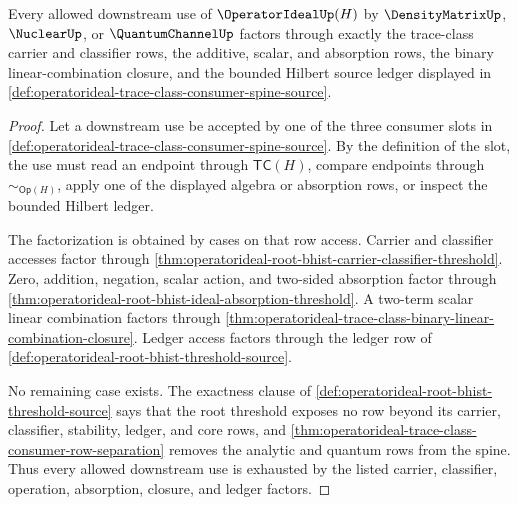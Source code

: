 \begin{theorem}
\label{thm:operatorideal-trace-class-consumer-exhaustion}
Every allowed downstream use of $\OperatorIdealUp(H)$ by $\DensityMatrixUp$, $\NuclearUp$, or $\QuantumChannelUp$ factors through exactly the trace-class carrier and classifier rows, the additive, scalar, and absorption rows, the binary linear-combination closure, and the bounded Hilbert source ledger displayed in \autoref{def:operatorideal-trace-class-consumer-spine-source}.
\end{theorem}
\begin{proof}
Let a downstream use be accepted by one of the three consumer slots in \autoref{def:operatorideal-trace-class-consumer-spine-source}. By the definition of the slot, the use must read an endpoint through $\mathsf{TC}(H)$, compare endpoints through $\sim_{\mathsf{Op}(H)}$, apply one of the displayed algebra or absorption rows, or inspect the bounded Hilbert ledger.

The factorization is obtained by cases on that row access. Carrier and classifier accesses factor through \autoref{thm:operatorideal-root-bhist-carrier-classifier-threshold}. Zero, addition, negation, scalar action, and two-sided absorption factor through \autoref{thm:operatorideal-root-bhist-ideal-absorption-threshold}. A two-term scalar linear combination factors through \autoref{thm:operatorideal-trace-class-binary-linear-combination-closure}. Ledger access factors through the ledger row of \autoref{def:operatorideal-root-bhist-threshold-source}.

No remaining case exists. The exactness clause of \autoref{def:operatorideal-root-bhist-threshold-source} says that the root threshold exposes no row beyond its carrier, classifier, stability, ledger, and core rows, and \autoref{thm:operatorideal-trace-class-consumer-row-separation} removes the analytic and quantum rows from the spine. Thus every allowed downstream use is exhausted by the listed carrier, classifier, operation, absorption, closure, and ledger factors.
\end{proof}


